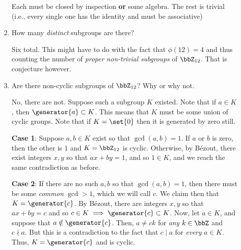\documentclass{article}
\begin{document}
\begin{enumerate}
\begin{enumerate}[start=1,label={\lparen\alph*\rparen}]
                Each must be closed by inspection \textbf{or} some algebra.
                The rest is trivial
                (i.e., every single one has the identity and must be associative)

          \item How many \emph{distinct} subgroups are there?

                Six total.
                This might have to do with the fact that $\phi(12) = 4$ and thus counting
                the number of \emph{proper non-trivial subgroups} of $\bbZ_{12}$.
                That is conjecture however.

          \item Are there non-cyclic subgroups of $\bbZ_{12}$? Why or why not.

                No, there are not. Suppose such a subgroup $K$ existed.
                Note that if $a \in K$, then $\generator{a} \subset K$.
                This means that $K$ must be some union of cyclic groups.
                Note that if $K = \set{0}$ then it is generated by zero still.

                \textbf{Case 1}: Suppose $a, b \in K$ exist so that $\gcd(a, b) = 1$.
                If $a$ or $b$ is zero, then the other is 1 and $K = \bbZ_{12}$ is cyclic.
                Otherwise, by B\'ezout, there exist integers $x, y$ so that $ax + by = 1$,
                and so $1 \in K$, and we reach the same contradiction as before.

                \textbf{Case 2}: If there are no such $a, b$ so that $\gcd(a, b) = 1$, then
                there must be some \emph{common} $\gcd > 1$, which we will call $c$.
                We claim then that $K = \generator{c}$.
		By B\'ezout, there are integers $x, y$ so that $ax + by = c$ and so $c \in K \implies \generator{c} \subset K$.
                Now, let $a \in K$, and suppose that $a \notin \generator{c}$.
                Then, $a \ne ck$ for \emph{any} $k \in \bbZ$ and $c \nmid a$.
		But this is a contradiction to the fact that $c \mid a$ for \emph{every} $a \in K$.
                Thus, $K = \generator{c}$ and is cyclic.
        \end{enumerate}

\end{enumerate}
\end{document}
